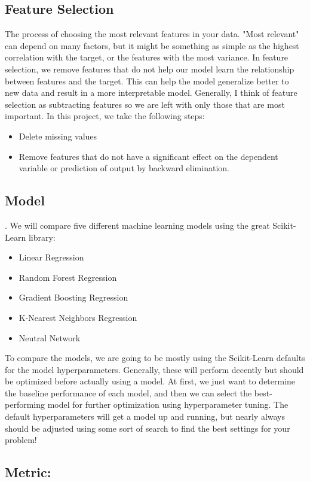 \documentclass{article}
\begin{document}
\subsection*{Feature Selection}
 The process of choosing the most relevant features in your data. "Most relevant" can depend on many factors, but it might be something as simple as the highest correlation with the target, or the features with the most variance. In feature selection, we remove features that do not help our model learn the relationship between features and the target. This can help the model generalize better to new data and result in a more interpretable model. Generally, I think of feature selection as subtracting features so we are left with only those that are most important.
In this project, we take the following steps:
\begin{itemize}
    \item Delete missing values
    \item Remove features that do not have a significant effect on the dependent variable or prediction of output by backward elimination.
\end{itemize}


\subsection*{Model}.
We will compare five different machine learning models using the great Scikit-Learn library:
\begin{itemize}
    \item Linear Regression
    \item Random Forest Regression
    \item Gradient Boosting Regression
    \item K-Nearest Neighbors Regression
    \item Neutral Network
\end{itemize}

To compare the models, we are going to be mostly using the Scikit-Learn defaults for the model hyperparameters. Generally, these will perform decently but should be optimized before actually using a model. At first, we just want to determine the baseline performance of each model, and then we can select the best-performing model for further optimization using hyperparameter tuning. The default hyperparameters will get a model up and running, but nearly always should be adjusted using some sort of search to find the best settings for your problem!

\subsection*{Metric:}
\end{document}

